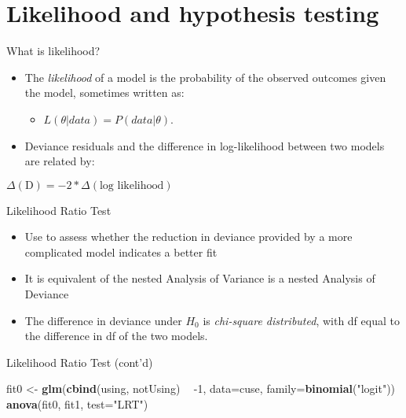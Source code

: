 \documentclass[
  ignorenonframetext,
]{beamer}
\newenvironment{Shaded}{\begin{snugshade}}{\end{snugshade}}
\newcommand{\DataTypeTok}[1]{\textcolor[rgb]{0.13,0.29,0.53}{#1}}
\newcommand{\DecValTok}[1]{\textcolor[rgb]{0.00,0.00,0.81}{#1}}
\newcommand{\KeywordTok}[1]{\textcolor[rgb]{0.13,0.29,0.53}{\textbf{#1}}}
\newcommand{\NormalTok}[1]{#1}
\newcommand{\OperatorTok}[1]{\textcolor[rgb]{0.81,0.36,0.00}{\textbf{#1}}}
\newcommand{\StringTok}[1]{\textcolor[rgb]{0.31,0.60,0.02}{#1}}
\providecommand{\tightlist}{%
  \setlength{\itemsep}{0pt}\setlength{\parskip}{0pt}}
\begin{document}
\hypertarget{likelihood-and-hypothesis-testing}{%
\section{Likelihood and hypothesis
testing}\label{likelihood-and-hypothesis-testing}}

\begin{frame}{What is likelihood?}
\protect\hypertarget{what-is-likelihood}{}

\begin{itemize}
\tightlist
\item
  The \emph{likelihood} of a model is the probability of the observed
  outcomes given the model, sometimes written as:

  \begin{itemize}
  \tightlist
  \item
    \(L(\theta | data) = P(data|\theta)\).
  \end{itemize}
\item
  Deviance residuals and the difference in log-likelihood between two
  models are related by:
\end{itemize}

\(\Delta (\textrm{D}) = -2 * \Delta (\textrm{log likelihood})\)

\end{frame}

\begin{frame}{Likelihood Ratio Test}
\protect\hypertarget{likelihood-ratio-test}{}

\begin{itemize}
\tightlist
\item
  Use to assess whether the reduction in deviance provided by a more
  complicated model indicates a better fit
\item
  It is equivalent of the nested Analysis of Variance is a nested
  Analysis of Deviance
\item
  The difference in deviance under \(H_0\) is \emph{chi-square
  distributed}, with df equal to the difference in df of the two models.
\end{itemize}

\end{frame}

\begin{frame}[fragile]{Likelihood Ratio Test (cont'd)}
\protect\hypertarget{likelihood-ratio-test-contd}{}

\scriptsize

\begin{Shaded}
\begin{Highlighting}[]
\NormalTok{fit0 <-}\StringTok{ }\KeywordTok{glm}\NormalTok{(}\KeywordTok{cbind}\NormalTok{(using, notUsing) }\OperatorTok{~}\StringTok{ }\DecValTok{-1}\NormalTok{, }\DataTypeTok{data=}\NormalTok{cuse, }
            \DataTypeTok{family=}\KeywordTok{binomial}\NormalTok{(}\StringTok{"logit"}\NormalTok{))}
\KeywordTok{anova}\NormalTok{(fit0, fit1, }\DataTypeTok{test=}\StringTok{"LRT"}\NormalTok{)}
\end{Highlighting}
\end{Shaded}

\end{frame}
\end{document}
